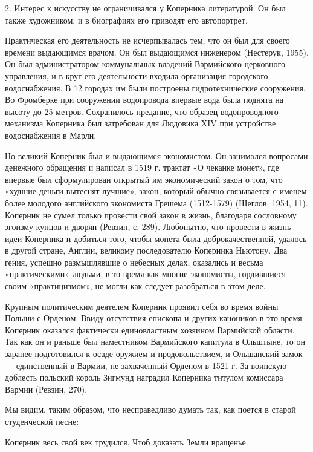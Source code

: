 2. Интерес к искусству не ограничивался у Коперника литературой. Он
был также художником, и в биографиях его приводят его автопортрет.

Практическая его деятельность не исчерпывалась тем, что он был для
своего времени выдающимся врачом. Он был выдающимся инженером
(Нестерук, 1955). Он был администратором коммунальных владений
Вармийского церковного управления, и в круг его деятельности входила
организация городского водоснабжения. В 12 городах им были построены
гидротехнические сооружения. Во Фромберке при сооружении водопровода
впервые вода была поднята на высоту до 25 метров. Сохранилось
предание, что образец водопроводного механизма Коперника был
затребован для Людовика XIV при устройстве водоснабжения в Марли.

Но великий Коперник был и выдающимся экономистом. Он занимался
вопросами денежного обращения и написал в 1519 г. трактат «О чеканке
монет», где впервые был сформулирован открытый им экономический закон
о том, что «худшие деньги вытеснят лучшие», закон, который обычно
связывается с именем более молодого английского экономиста Грешема
(1512-1579) (Щеглов, 1954, 11). Коперник не сумел только провести свой
закон в жизнь, благодаря сословному эгоизму купцов и дворян (Ревзин,
с. 289). Любопытно, что провести в жизнь идеи Коперника и добиться
того, чтобы монета была доброкачественной, удалось в другой стране,
Англии, великому последователю Коперника Ньютону. Два гения, успешно
размышлявшие о небесных делах, оказались и весьма «практическими»
людьми, в то время как многие экономисты, гордившиеся своим
«практицизмом», не могли как следует разобраться в этом деле.

Крупным политическим деятелем Коперник проявил себя во время войны
Польши с Орденом. Ввиду отсутствия епископа и других каноников в это
время Коперник оказался фактически единовластным хозяином Вармийской
области. Так как он и раньше был наместником Вармийского капитула в
Ольштыне, то он заранее подготовился к осаде оружием и
продовольствием, и Ольшанский замок --- единственный в Вармии, не
захваченный Орденом в 1521 г. За воинскую доблесть польский король
Зигмунд наградил Коперника титулом комиссара Вармии (Ревзин, 270).

Мы видим, таким образом, что несправедливо думать так, как поется в
старой студенческой песне:

Коперник весь свой век трудился, Чтоб доказать Земли вращенье.


